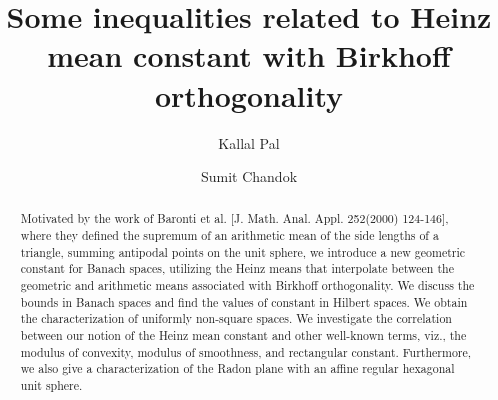 \documentclass[preprint,12pt]{elsarticle}
\numberwithin{equation}{section}
\begin{document}
\begin{frontmatter}



\title{Some inequalities related to Heinz mean constant with Birkhoff orthogonality}


\author{Kallal Pal} %
\author{Sumit Chandok}
\begin{abstract}
Motivated by the work of  Baronti et al. [J. Math. Anal. Appl. 252(2000)
124-146], where they defined the supremum of an arithmetic mean of the side lengths of a triangle, summing antipodal points on the unit sphere, we introduce a new geometric constant for Banach spaces, utilizing the Heinz means that interpolate between the geometric and arithmetic means associated with Birkhoff orthogonality. We discuss the bounds in Banach spaces and find the values of constant in Hilbert spaces.  We obtain the characterization of uniformly non-square spaces. We investigate the correlation between our notion of the Heinz mean constant and other well-known terms, viz., the modulus of convexity, modulus of smoothness, and rectangular constant.
Furthermore, we also
 give a characterization of the Radon plane with an affine regular hexagonal unit sphere.
\end{abstract}


\end{frontmatter}
\end{document}
